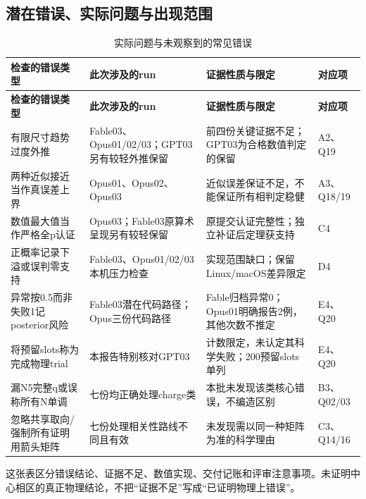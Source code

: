 \documentclass[11pt,a4paper]{article}
\begin{document}
\clearpage
\subsection{潜在错误、实际问题与出现范围}
{\fontsize{9.0}{12.6}\selectfont
\setlength{\tabcolsep}{2.5pt}
\begin{longtable}{>{\raggedright\arraybackslash}p{}>{\raggedright\arraybackslash}p{}>{\raggedright\arraybackslash}p{}>{\raggedright\arraybackslash}p{}}
\caption{实际问题与未观察到的常见错误}\\
\toprule
\textbf{检查的错误类型} & \textbf{此次涉及的run} & \textbf{证据性质与限定} & \textbf{对应项}\tabularnewline
\midrule
\endfirsthead
\toprule
\textbf{检查的错误类型} & \textbf{此次涉及的run} & \textbf{证据性质与限定} & \textbf{对应项}\tabularnewline
\midrule
\endhead
{}有限尺寸趋势过度外推 & Fable03、Opus01/02/03；GPT03另有较轻外推保留 & 前四份关键证据不足；GPT03为合格数值判定的保留 & A2、Q19\tabularnewline
{}两种近似接近当作真误差上界 & Opus01、Opus02、Opus03 & 近似误差保证不足，不能保证所有相判定稳健 & A3、Q18/19\tabularnewline
{}数值最大值当作严格全p认证 & Opus03；Fable03原算术呈现另有较轻保留 & 原提交认证完整性；独立补证后定理获支持 & C4\tabularnewline
{}正概率记录下溢或误判零支持 & Fable03、Opus01/02/03本机压力检查 & 实现范围缺口；保留Linux/macOS差异限定 & D4\tabularnewline
{}异常按0.5而非失败1记posterior风险 & Fable03潜在代码路径；Opus三份代码路径 & Fable归档异常0；Opus01明确报告2例，其他次数不推定 & E4、Q20\tabularnewline
{}将预留slots称为完成物理trial & 本报告特别核对GPT03 & 计数限定，未认定其科学失败；200预留slots单列 & E4、Q20\tabularnewline
{}漏N5完整q或误称所有N单调 & 七份均正确处理charge类 & 本批未发现该类核心错误，不编造区别 & B3、Q02/03\tabularnewline
{}忽略共享取向/强制所有证明用箭头矩阵 & 七份处理相关性路线不同且有效 & 未发现需以同一种矩阵为准的科学理由 & C3、Q14/16\tabularnewline
\bottomrule
\end{longtable}
}
这张表区分错误结论、证据不足、数值实现、交付记账和评审注意事项。未证明中心相区的真正物理结论，不把“证据不足”写成“已证明物理上错误”。

\clearpage
\end{document}
